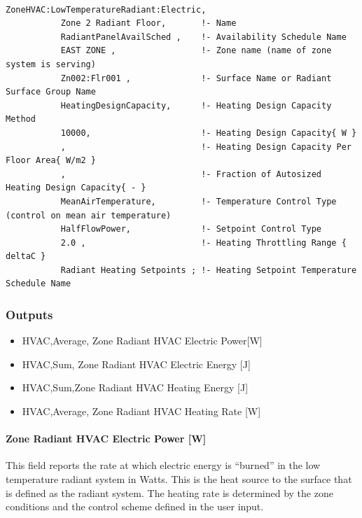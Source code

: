 \begin{lstlisting}

ZoneHVAC:LowTemperatureRadiant:Electric,
           Zone 2 Radiant Floor,       !- Name
           RadiantPanelAvailSched ,    !- Availability Schedule Name
           EAST ZONE ,                 !- Zone name (name of zone system is serving)
           Zn002:Flr001 ,              !- Surface Name or Radiant Surface Group Name
           HeatingDesignCapacity,      !- Heating Design Capacity Method
           10000,                      !- Heating Design Capacity{ W }
           ,                           !- Heating Design Capacity Per Floor Area{ W/m2 }
           ,                           !- Fraction of Autosized Heating Design Capacity{ - }
           MeanAirTemperature,         !- Temperature Control Type (control on mean air temperature)
           HalfFlowPower,              !- Setpoint Control Type
           2.0 ,                       !- Heating Throttling Range { deltaC }
           Radiant Heating Setpoints ; !- Heating Setpoint Temperature Schedule Name
\end{lstlisting}

\subsubsection{Outputs}\label{outputs-7-007}

\begin{itemize}
\item
  HVAC,Average, Zone Radiant HVAC Electric Power{[}W{]}
\item
  HVAC,Sum, Zone Radiant HVAC Electric Energy {[}J{]}
\item
  HVAC,Sum,Zone Radiant HVAC Heating Energy {[}J{]}
\item
  HVAC,Average, Zone Radiant HVAC Heating Rate {[}W{]}
\end{itemize}

\paragraph{Zone Radiant HVAC Electric Power {[}W{]}}\label{zone-radiant-hvac-electric-power-w}

This field reports the rate at which electric energy is ``burned'' in the low temperature radiant system in Watts. This is the heat source to the surface that is defined as the radiant system. The heating rate is determined by the zone conditions and the control scheme defined in the user input.

